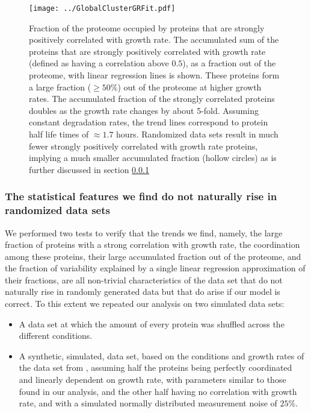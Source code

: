 \documentclass{article}
\begin{document}
\begin{figure}[H]
\begin{center}
\texttt{[image: ../GlobalClusterGRFit.pdf]}
\caption{\label{fig:globalgrcorr}
Fraction of the proteome occupied by proteins that are strongly positively correlated with growth rate.
The accumulated sum of the proteins that are strongly positively correlated with growth rate (defined as having a correlation above $0.5$), as a fraction out of the proteome, with linear regression lines is shown.
These proteins form a large fraction ($\ge 50\%$) out of the proteome at higher growth rates.
The accumulated fraction of the strongly correlated proteins doubles as the growth rate changes by about 5-fold.
Assuming constant degradation rates, the trend lines correspond to protein half life times of $\approx 1.7$ hours.
Randomized data sets result in much fewer strongly positively correlated with growth rate proteins, implying a much smaller accumulated fraction (hollow circles) as is further discussed in section \ref{randanalysis}
%
}
\end{center}
\end{figure}

\subsubsection{The statistical features we find do not naturally rise in randomized data sets}
\label{randanalysis}
We performed two tests to verify that the trends we find, namely, the large fraction of proteins with a strong correlation with growth rate, the coordination among these proteins, their large accumulated fraction out of the proteome, and the fraction of variability explained by a single linear regression approximation of their fractions, are all non-trivial characteristics of the data set that do not naturally rise in randomly generated data but that do arise if our model is correct.
To this extent we repeated our analysis on two simulated data sets:
\begin{itemize}
\item A data set at which the amount of every protein was shuffled across the different conditions.
\item A synthetic, simulated, data set, based on the conditions and growth rates of the data set from \cite{Heinemann2015}, assuming half the proteins being perfectly coordinated and linearly dependent on growth rate, with parameters similar to those found in our analysis, and the other half having no correlation with growth rate, and with a simulated normally distributed measurement noise of $25\%$.
\end{itemize}
\end{document}
